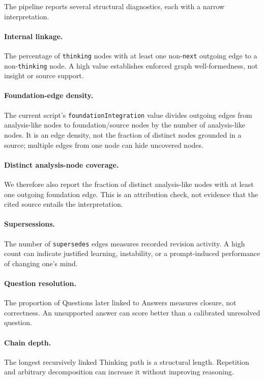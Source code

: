 The pipeline reports several structural diagnostics, each with a narrow
interpretation.

\paragraph{Internal linkage.} The percentage of \texttt{thinking} nodes with at
least one non-\texttt{next} outgoing edge to a non-\texttt{thinking} node. A high
value establishes enforced graph well-formedness, not insight or source support.

\paragraph{Foundation-edge density.} The current script's
\texttt{foundationIntegration} value divides outgoing edges from analysis-like
nodes to foundation/source nodes by the number of analysis-like nodes. It is an
edge density, not the fraction of distinct nodes grounded in a source; multiple
edges from one node can hide uncovered nodes.

\paragraph{Distinct analysis-node coverage.} We therefore also report the
fraction of distinct analysis-like nodes with at least one outgoing foundation
edge. This is an attribution check, not evidence that the cited source entails
the interpretation.

\paragraph{Supersessions.} The number of \texttt{supersedes} edges measures
recorded revision activity. A high count can indicate justified learning,
instability, or a prompt-induced performance of changing one's mind.

\paragraph{Question resolution.} The proportion of Questions later linked to
Answers measures closure, not correctness. An unsupported answer can score
better than a calibrated unresolved question.

\paragraph{Chain depth.} The longest recursively linked Thinking path is a
structural length. Repetition and arbitrary decomposition can increase it
without improving reasoning.

